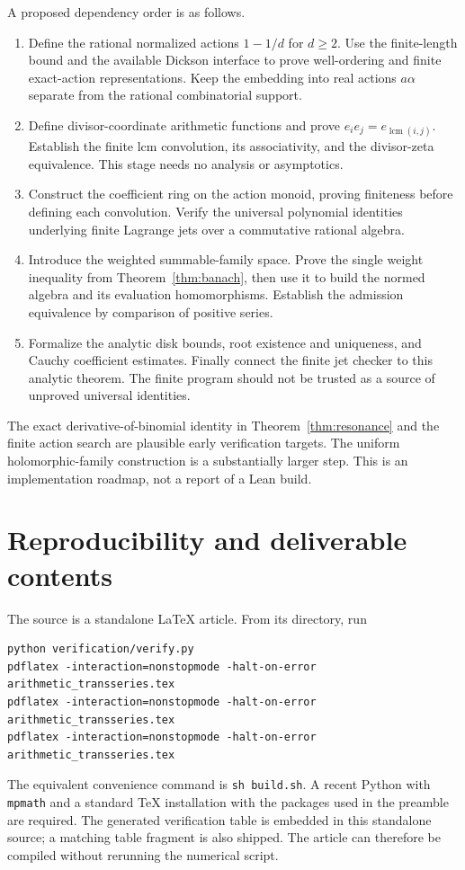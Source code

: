 \documentclass[11pt,a4paper]{article}
\numberwithin{equation}{section}
\theoremstyle{definition}
\theoremstyle{remark}
\newcommand{\lcm}{\operatorname{lcm}}
\begin{document}
A proposed dependency order is as follows.
\begin{enumerate}
\item Define the rational normalized actions $1-1/d$ for $d\ge2$.
Use the finite-length bound and the available Dickson interface to
prove well-ordering and finite exact-action representations. Keep the
embedding into real actions $a\alpha$ separate from the rational
combinatorial support.
\item Define divisor-coordinate arithmetic functions and prove
$e_i e_j=e_{\lcm(i,j)}$. Establish the finite lcm convolution, its
associativity, and the divisor-zeta equivalence. This stage needs no
analysis or asymptotics.
\item Construct the coefficient ring on the action monoid, proving
finiteness before defining each convolution. Verify the universal
polynomial identities underlying finite Lagrange jets over a
commutative rational algebra.
\item Introduce the weighted summable-family space. Prove the single
weight inequality from Theorem~\ref{thm:banach}, then use it to build
the normed algebra and its evaluation homomorphisms. Establish the
admission equivalence by comparison of positive series.
\item Formalize the analytic disk bounds, root existence and uniqueness,
and Cauchy coefficient estimates. Finally connect the finite jet
checker to this analytic theorem. The finite program should not be
trusted as a source of unproved universal identities.
\end{enumerate}

The exact derivative-of-binomial identity in
Theorem~\ref{thm:resonance} and the finite action search are plausible
early verification targets. The uniform holomorphic-family construction
is a substantially larger step. This is an implementation roadmap,
not a report of a Lean build.

\section{Reproducibility and deliverable contents}\label{app:repro}

The source is a standalone LaTeX article. From its directory, run
\begin{verbatim}
python verification/verify.py
pdflatex -interaction=nonstopmode -halt-on-error arithmetic_transseries.tex
pdflatex -interaction=nonstopmode -halt-on-error arithmetic_transseries.tex
pdflatex -interaction=nonstopmode -halt-on-error arithmetic_transseries.tex
\end{verbatim}
The equivalent convenience command is \texttt{sh build.sh}. A recent
Python with \texttt{mpmath} and a standard TeX installation with the
packages used in the preamble are required. The generated verification table is embedded in this standalone source;
a matching table fragment is also shipped. The article can therefore be
compiled without rerunning the numerical script.
\end{document}
